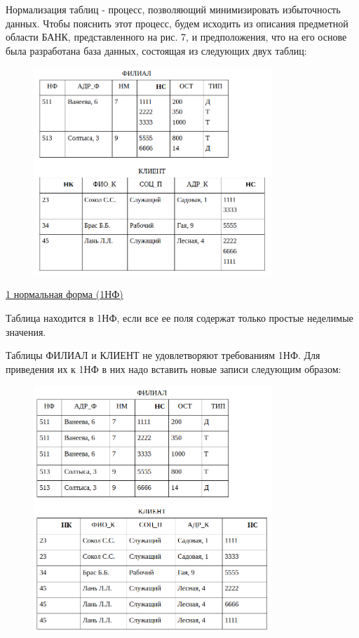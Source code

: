 \begin{enumerate}
        Нормализация таблиц - процесс, позволяющий минимизировать избыточность данных. Чтобы пояснить этот процесс,
        будем исходить из описания предметной области БАНК, представленного на рис. 7, и предположения, что на его
        основе была разработана база данных, состоящая из следующих двух таблиц:

    \begin{figure}[H]
        \centering
        \includegraphics[width=0.8\textwidth]{assets/security/pic18.png}
        \label{fig:mesh20}
    \end{figure}

    \underline{1 нормальная форма (1НФ)}

    Таблица находится в 1НФ, если все ее поля содержат только простые неделимые значения.

    Таблицы ФИЛИАЛ и КЛИЕНТ не удовлетворяют требованиям 1НФ. Для приведения их к 1НФ в них надо вставить новые
    записи следующим образом:

    \begin{figure}[H]
        \centering
        \includegraphics[width=0.8\textwidth]{assets/security/pic19.png}
        \label{fig:mesh21}
    \end{figure}


\end{enumerate}
